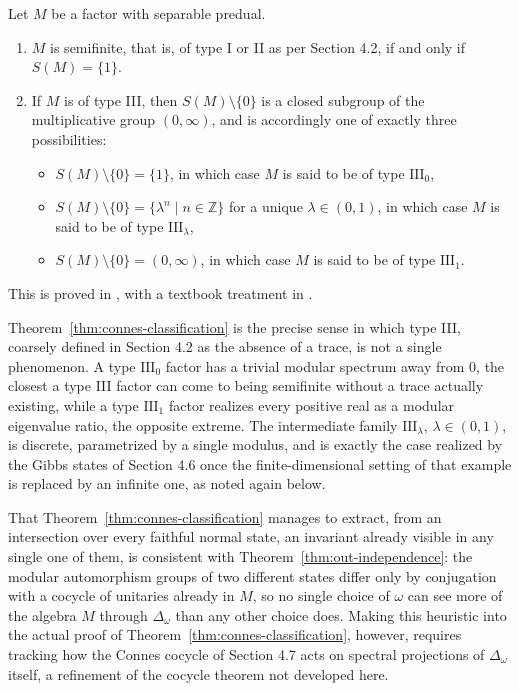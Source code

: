 \begin{theorem}[Connes, 1973]\label{thm:connes-classification}
	Let $M$ be a factor with separable predual.
	\begin{enumerate}
		\item[(a)] $M$ is semifinite, that is, of type I or II as per Section 4.2, if and only if $S(M) = \{1\}$.
		\item[(b)] If $M$ is of type III, then $S(M)\setminus\{0\}$ is a closed subgroup of the multiplicative group $(0,\infty)$, and is accordingly one of exactly three possibilities:
		\begin{itemize}
			\item $S(M)\setminus\{0\} = \{1\}$, in which case $M$ is said to be of type $\mathrm{III}_0$,
			\item $S(M)\setminus\{0\} = \{\lambda^n \mid n \in \mathbb{Z}\}$ for a unique $\lambda \in (0,1)$, in which case $M$ is said to be of type $\mathrm{III}_\lambda$,
			\item $S(M)\setminus\{0\} = (0,\infty)$, in which case $M$ is said to be of type $\mathrm{III}_1$.
		\end{itemize}
	\end{enumerate}
\end{theorem}
\noindent This is proved in \cite[TODO: collocazione precisa]{TODO-Connes73}, with a textbook treatment in \cite[TODO: collocazione precisa]{TODO-Stratila}.

\begin{remark}
	Theorem~\ref{thm:connes-classification} is the precise sense in which type III, coarsely defined in Section 4.2 as the absence of a trace, is not a single phenomenon. A type $\mathrm{III}_0$ factor has a trivial modular spectrum away from $0$, the closest a type III factor can come to being semifinite without a trace actually existing, while a type $\mathrm{III}_1$ factor realizes every positive real as a modular eigenvalue ratio, the opposite extreme. The intermediate family $\mathrm{III}_\lambda$, $\lambda \in (0,1)$, is discrete, parametrized by a single modulus, and is exactly the case realized by the Gibbs states of Section 4.6 once the finite-dimensional setting of that example is replaced by an infinite one, as noted again below.
\end{remark}

That Theorem~\ref{thm:connes-classification} manages to extract, from an intersection over every faithful normal state, an invariant already visible in any single one of them, is consistent with Theorem~\ref{thm:out-independence}: the modular automorphism groups of two different states differ only by conjugation with a cocycle of unitaries already in $M$, so no single choice of $\omega$ can see more of the algebra $M$ through $\Delta_\omega$ than any other choice does. Making this heuristic into the actual proof of Theorem~\ref{thm:connes-classification}, however, requires tracking how the Connes cocycle of Section 4.7 acts on spectral projections of $\Delta_\omega$ itself, a refinement of the cocycle theorem not developed here.

